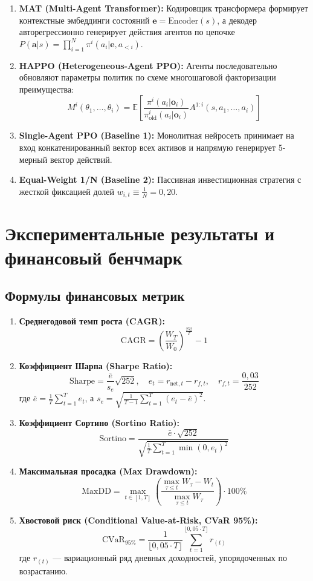 \documentclass[11pt,a4paper]{article}
\begin{document}
\begin{enumerate}[leftmargin=*]
\item \textbf{MAT (Multi-Agent Transformer):} Кодировщик трансформера формирует контекстные эмбеддинги состояний $\mathbf{e} = \text{Encoder}(s)$, а декодер авторегрессионно генерирует действия агентов по цепочке $P(\mathbf{a}|s) = \prod_{i=1}^N \pi^i(a_i | \mathbf{e}, a_{<i})$.

\item \textbf{HAPPO (Heterogeneous-Agent PPO):} Агенты последовательно обновляют параметры политик по схеме многошаговой факторизации преимущества:
$$M^i(\theta_1, \dots, \theta_i) = \mathbb{E} \left[ \frac{\pi^i(a_i|\mathbf{o}_i)}{\pi_{\text{old}}^i(a_i|\mathbf{o}_i)} A^{1:i}(s, a_1, \dots, a_i) \right]$$

\item \textbf{Single-Agent PPO (Baseline 1):} Монолитная нейросеть принимает на вход конкатенированный вектор всех активов и напрямую генерирует 5-мерный вектор действий.

\item \textbf{Equal-Weight 1/N (Baseline 2):} Пассивная инвестиционная стратегия с жесткой фиксацией долей $w_{i, t} \equiv \frac{1}{N} = 0{,}20$.
\end{enumerate}

\section{Экспериментальные результаты и финансовый бенчмарк}

\subsection{Формулы финансовых метрик}

\begin{enumerate}[leftmargin=*]
\item \textbf{Среднегодовой темп роста (CAGR):}
$$\text{CAGR} = \left( \frac{W_T}{W_0} \right)^{\frac{252}{T}} - 1$$
\item \textbf{Коэффициент Шарпа (Sharpe Ratio):}
$$\text{Sharpe} = \frac{\bar{e}}{s_e} \sqrt{252}, \quad e_t = r_{\text{net}, t} - r_{f, t}, \quad r_{f, t} = \frac{0{,}03}{252}$$
где $\bar{e} = \frac{1}{T} \sum_{t=1}^T e_t$, а $s_e = \sqrt{\frac{1}{T-1} \sum_{t=1}^T (e_t - \bar{e})^2}$.
\item \textbf{Коэффициент Сортино (Sortino Ratio):}
$$\text{Sortino} = \frac{\bar{e} \cdot \sqrt{252}}{\sqrt{\frac{1}{T} \sum_{t=1}^T \min(0, e_t)^2}}$$
\item \textbf{Максимальная просадка (Max Drawdown):}
$$\text{MaxDD} = \max_{t \in [1, T]} \left( \frac{\max_{\tau \le t} W_\tau - W_t}{\max_{\tau \le t} W_\tau} \right) \cdot 100\%$$
\item \textbf{Хвостовой риск (Conditional Value-at-Risk, CVaR 95\%):}
$$\text{CVaR}_{95\%} = \frac{1}{\lfloor 0{,}05 \cdot T \rfloor} \sum_{t=1}^{\lfloor 0{,}05 \cdot T \rfloor} r_{(t)}$$
где $r_{(t)}$ --- вариационный ряд дневных доходностей, упорядоченных по возрастанию.
\end{enumerate}
\end{document}
